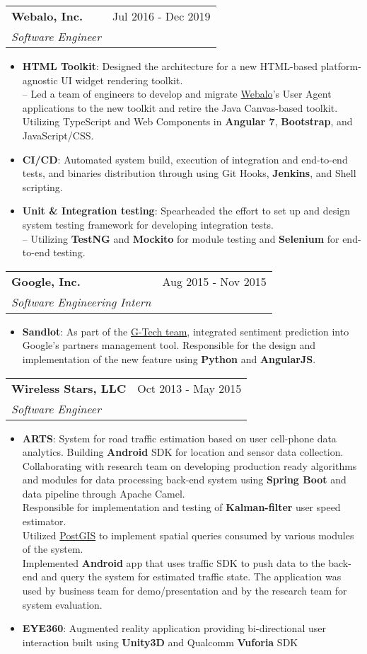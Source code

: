 \documentclass[letterpaper,11pt]{article}
\makeatletter
\newcommand{\resumeItem}[2]{
  \item\small{
    \textbf{#1}{: #2 \vspace{-2pt}}
  }
}
\newcommand{\resumeSubheading}[4]{
  \vspace{-1pt}\item
    \begin{tabular*}{0.97\textwidth}[t]{l@{\extracolsep{\fill}}r}
      \textbf{#1} & #2 \\
      \textit{\small #3} & \textit{\small #4} \\
    \end{tabular*}\vspace{-5pt}
}
\newcommand{\resumeItemListStart}{\begin{itemize}}
\newcommand{\resumeItemListEnd}{\end{itemize}\vspace{-5pt}}
\makeatother
\begin{document}
    \resumeSubheading
      {Webalo, Inc.}{Jul 2016 - Dec 2019}
      {Software Engineer}{}
      \resumeItemListStart
        \resumeItem{HTML Toolkit}
          {Designed the architecture for a new HTML-based platform-agnostic UI widget rendering toolkit.\\
          -- Led a team of engineers to develop and migrate \href{https://www.webalo.com/platform.php}{Webalo}'s User Agent applications to the new toolkit and retire the Java Canvas-based toolkit.
          Utilizing TypeScript and Web Components in \textbf{Angular 7}, \textbf{Bootstrap}, and JavaScript/CSS.}
        \resumeItem{CI/CD}
          {Automated system build, execution of integration and end-to-end tests, and binaries distribution through using Git Hooks, \textbf{Jenkins}, and Shell scripting.}
        \resumeItem{Unit \& Integration testing}
          {Spearheaded the effort to set up and design system testing framework for developing integration tests.\\
          -- Utilizing \textbf{TestNG} and \textbf{Mockito} for module testing and \textbf{Selenium} for end-to-end testing.}
      \resumeItemListEnd

    \resumeSubheading
      {Google, Inc.}{Aug 2015 - Nov 2015}
      {Software Engineering Intern}{}
      \resumeItemListStart
        \resumeItem{Sandlot}
          {As part of the \href{https://careersonair.withgoogle.com/events/insidegtech}{G-Tech team}, integrated sentiment prediction into Google's partners management tool. Responsible for the design and implementation of the new feature using \textbf{Python} and \textbf{AngularJS}.}
      \resumeItemListEnd
      
\pagebreak

    \resumeSubheading
      {Wireless Stars, LLC}{Oct 2013 - May 2015}
      {Software Engineer}{}
      \resumeItemListStart
        \resumeItem{ARTS}
          {System for road traffic estimation based on user cell-phone data analytics. Building \textbf{Android} SDK for location and sensor data collection.\\
          Collaborating with research team on developing production ready algorithms and modules for data processing back-end system using \textbf{Spring Boot} and data pipeline through Apache Camel.\\
          Responsible for implementation and testing of \textbf{Kalman-filter} user speed estimator.\\
          Utilized \href{https://postgis.net/}{PostGIS} to implement spatial queries consumed by various modules of the system.\\
          Implemented \textbf{Android} app that uses traffic SDK to push data to the back-end and query the system for estimated traffic state. The application was used by business team for demo/presentation and by the research team for system evaluation.}
        \resumeItem{EYE360}
          {Augmented reality application providing bi-directional user interaction built using \textbf{Unity3D} and Qualcomm \textbf{Vuforia} SDK}
      \resumeItemListEnd
\end{document}
